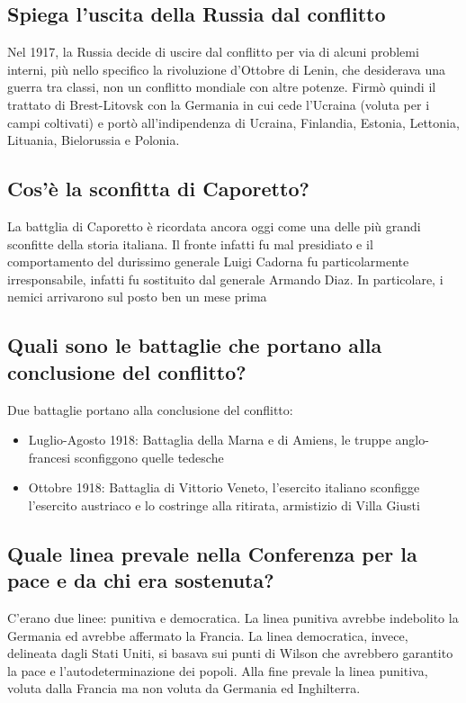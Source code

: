 \documentclass{article}
\begin{document}
\subsection{Spiega l'uscita della Russia dal conflitto}
Nel 1917, la Russia decide di uscire dal conflitto per via di alcuni problemi interni, più nello specifico la rivoluzione
d'Ottobre di Lenin, che desiderava una guerra tra classi, non un conflitto mondiale con altre potenze. Firmò quindi il
trattato di Brest-Litovsk con la Germania in cui cede l'Ucraina (voluta per i campi coltivati) e portò all'indipendenza
di Ucraina, Finlandia, Estonia, Lettonia, Lituania, Bielorussia e Polonia.

\subsection{Cos'è la sconfitta di Caporetto?}
La battglia di Caporetto è ricordata ancora oggi come una delle più grandi sconfitte della storia italiana. Il fronte infatti
fu mal presidiato e il comportamento del durissimo generale Luigi Cadorna fu particolarmente irresponsabile, infatti fu
sostituito dal generale Armando Diaz. In particolare, i nemici arrivarono sul posto ben un mese prima

\subsection{Quali sono le battaglie che portano alla conclusione del conflitto?}
Due battaglie portano alla conclusione del conflitto:
\begin{itemize}
    \item Luglio-Agosto 1918: Battaglia della Marna e di Amiens, le truppe anglo-francesi sconfiggono quelle tedesche
    \item Ottobre 1918: Battaglia di Vittorio Veneto, l'esercito italiano sconfigge l'esercito austriaco e lo costringe
          alla ritirata, armistizio di Villa Giusti
\end{itemize}

\subsection{Quale linea prevale nella Conferenza per la pace e da chi era sostenuta?}
C'erano due linee: punitiva e democratica. La linea punitiva avrebbe indebolito la Germania ed avrebbe affermato la Francia.
La linea democratica, invece, delineata dagli Stati Uniti, si basava sui punti di Wilson che avrebbero garantito la pace e
l'autodeterminazione dei popoli. Alla fine prevale la linea punitiva, voluta dalla Francia ma non voluta da Germania ed
Inghilterra.
\end{document}
